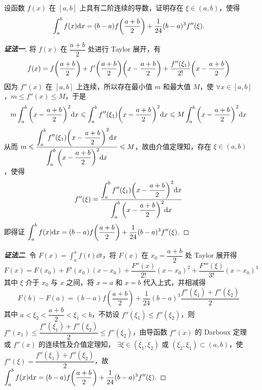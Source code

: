 \begin{example}
    设函数 $f(x)$ 在 $[a,b]$ 上具有二阶连续的导数，证明存在 $\xi\in(a,b)$，使得
    $$\int_{a}^{b}f(x)\dd x=(b-a)f\qty(\dfrac{a+b}{2})+\dfrac{1}{24}(b-a)^3f''(\xi).$$
\end{example}
\begin{proof}[{\songti \textbf{证法一}}]
    将 $f(x)$ 在 $\dfrac{a+b}{2}$ 处进行 Taylor 展开，有
    $$f(x)=f\qty(\dfrac{a+b}{2})+f'\qty(\dfrac{a+b}{2})\qty(x-\dfrac{a+b}{2})+\dfrac{f''(\xi_1)}{2!}\qty(x-\dfrac{a+b}{2})$$
    因为 $f''(x)$ 在 $[a,b]$ 上连续，所以存在最小值 $m$ 和最大值 $M$，使 $\forall x\in[a,b]$，$m\leqslant f''(x) \leqslant M$，于是
    $$m\int_{a}^{b}\qty(x-\dfrac{a+b}{2})^2\dd x\leqslant \int_{a}^{b}f''(\xi_1)\qty(x-\dfrac{a+b}{2})^2\dd x\leqslant M\int_{a}^{b}\qty(x-\dfrac{a+b}{2})^2\dd x$$
    从而 $\displaystyle m\leqslant \dfrac{\displaystyle \int_{a}^{b}f''(\xi_1)\qty(x-\dfrac{a+b}{2})^2\dd x}{\displaystyle \int_{a}^{b}\qty(x-\dfrac{a+b}{2})^2\dd x}\leqslant M$，故由介值定理知，存在 $\xi\in(a,b)$，使得
    $$f''(\xi)=\dfrac{\displaystyle\int_{a}^{b}f''(\xi_1)\qty(x-\dfrac{a+b}{2})^2\dd x}{\displaystyle \int_{a}^{b}\qty(x-\dfrac{a+b}{2})^2\dd x}$$
    即得证 $\displaystyle\int_{a}^{b}f(x)\dd x=(b-a)f\qty(\dfrac{a+b}{2})+\dfrac{1}{24}(b-a)^3f''(\xi).$
\end{proof}
\begin{proof}[{\songti \textbf{证法二}}]
    令 $\displaystyle F(x)=\int_{a}^{x}f(t)\dd t$，将 $F(x)$ 在 $x_0=\dfrac{a+b}{2}$ 处 Taylor 展开得
    $$F(x)  =F\left( x_{0}\right) +F'\left( x_{0}\right) \left( x-x_{0}\right) +\dfrac{F''(x)  }{2!}\left( x-x_{0}\right) ^{2}+\dfrac{F'''\left( \xi \right) }{3!}\left( x-x_{0}\right) ^{3}$$
    其中 $\xi$ 介于 $x_0$ 与 $x$ 之间，将 $x=a$ 和 $x=b$ 代入上式，并相减得
    $$F\left( b\right) -F\left( a\right) =\left( b-a\right) f\left( \dfrac{a+b}{2}\right) +\dfrac{1}{24}\left( b-a\right) ^{3}\dfrac{f''\left( \xi _{1}\right) +f''\left( \xi _{2}\right) }{2}$$
    其中 $a <\xi _{2} <\dfrac{a+b}{2} <\xi _{1} <b$，不妨设 $f''(\xi_1)\leqslant f''(\xi_2)$，则 $f''(x_1)\leqslant \dfrac{f''(\xi_1)+f''(\xi_2)}{2}\leqslant f''(\xi_2)$，由导函数 $f''(x)$ 的 Darboux 定理或 $f''(x)$ 的连续性及介值定理知，
    $\exists\xi\in(\xi_1,\xi_2)$ 或 $(\xi_2,\xi_1)\subset (a,b)$，使 $f''(\xi)=\dfrac{f''(\xi_1)+f''(\xi_2)}{2}$，故 $\displaystyle\int_{a}^{b}f(x)\dd x=(b-a)f\qty(\dfrac{a+b}{2})+\dfrac{1}{24}(b-a)^3f''(\xi).$
\end{proof}
